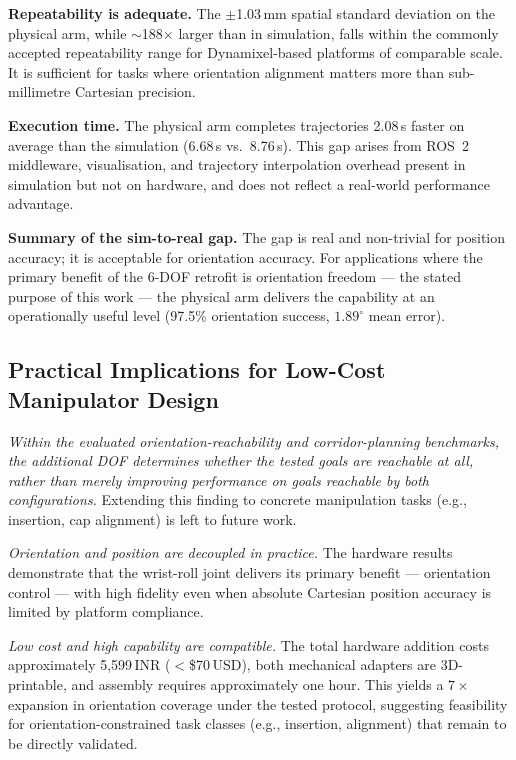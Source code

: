\documentclass[conference]{IEEEtran}
\begin{document}
	\textbf{Repeatability is adequate.}
	The $\pm$1.03\,mm spatial standard deviation on the physical arm,
	while $\sim$188$\times$ larger than in simulation, falls within the
	commonly accepted repeatability range for Dynamixel-based platforms of
	comparable scale. It is sufficient for tasks where orientation
	alignment matters more than sub-millimetre Cartesian precision.
	
	\textbf{Execution time.}
	The physical arm completes trajectories 2.08\,s faster on average than
	the simulation (6.68\,s vs.\ 8.76\,s). This gap arises from ROS~2
	middleware, visualisation, and trajectory interpolation overhead
	present in simulation but not on hardware, and does not reflect a
	real-world performance advantage.
	
	\textbf{Summary of the sim-to-real gap.}
	The gap is real and non-trivial for position accuracy; it is
	acceptable for orientation accuracy. For applications where the primary
	benefit of the 6-DOF retrofit is orientation freedom --- the stated
	purpose of this work --- the physical arm delivers the capability at an
	operationally useful level (97.5\% orientation success, $1.89^\circ$
	mean error).
	
	\subsection{Practical Implications for Low-Cost Manipulator Design}
	
	\textit{Within the evaluated orientation-reachability and
		corridor-planning benchmarks, the additional DOF determines whether
		the tested goals are reachable at all, rather than merely improving
		performance on goals reachable by both configurations.}
	Extending this finding to concrete manipulation tasks (e.g., insertion,
	cap alignment) is left to future work.
	
	\textit{Orientation and position are decoupled in practice.}
	The hardware results demonstrate that the wrist-roll joint delivers its
	primary benefit --- orientation control --- with high fidelity even
	when absolute Cartesian position accuracy is limited by platform
	compliance.
	
	\textit{Low cost and high capability are compatible.}
	The total hardware addition costs approximately 5,599\,INR
	($<$\$70\,USD), both mechanical adapters are 3D-printable, and
	assembly requires approximately one hour. This yields a $7\times$
	expansion in orientation coverage under the tested protocol, suggesting
	feasibility for orientation-constrained task classes (e.g., insertion,
	alignment) that remain to be directly validated.
	
\end{document}
